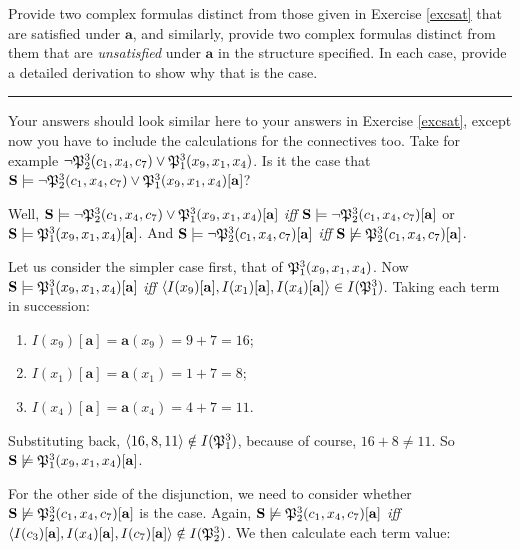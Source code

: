 \begin{exc}
Provide two complex formulas distinct from those given in Exercise \ref{excsat} that are satisfied under $\mathbf{a}$, and similarly, provide two complex formulas distinct from them that are \textit{unsatisfied} under $\mathbf{a}$ in the structure specified. In each case, provide a detailed derivation to show why that is the case. 
\end{exc}

\hrule\medskip

\begin{remark}
Your answers should look similar here to your answers in Exercise \ref{excsat}, except now you have to include the calculations for the connectives too. Take for example $\neg\mathfrak{P}^{3}_{2}(c_1, x_4, c_7) \vee \mathfrak{P}^{3}_{1}(x_9, x_1, x_4)$. Is it the case that $\mathbf{S} \models \neg\mathfrak{P}^{3}_{2}(c_1, x_4, c_7) \vee \mathfrak{P}^{3}_{1}(x_9, x_1, x_4)[\mathbf{a}]$?

Well, $\mathbf{S} \models \neg\mathfrak{P}^{3}_{2}(c_1, x_4, c_7) \vee \mathfrak{P}^{3}_{1}(x_9, x_1, x_4)[\mathbf{a}]$ \textit{iff} $\mathbf{S} \models \neg\mathfrak{P}^{3}_{2}(c_1, x_4, c_7)[\mathbf{a}]$ or $\mathbf{S} \models \mathfrak{P}^{3}_{1}(x_9, x_1, x_4)[\mathbf{a}]$. And $\mathbf{S} \models \neg\mathfrak{P}^{3}_{2}(c_1, x_4, c_7)[\mathbf{a}]$ \textit{iff} $\mathbf{S} \not\models \mathfrak{P}^{3}_{2}(c_1, x_4, c_7)[\mathbf{a}]$. 

Let us consider the simpler case first, that of $\mathfrak{P}^{3}_{1}(x_9, x_1, x_4)$. Now  $\mathbf{S} \models \mathfrak{P}^{3}_{1}(x_9, x_1, x_4)[\mathbf{a}]$ \textit{iff} $\langle I(x_9)[\mathbf{a}], I(x_1)[\mathbf{a}], I(x_4)[\mathbf{a}]\rangle \in I(\mathfrak{P}^{3}_{1})$. Taking each term in succession: 

\begin{enumerate}
	\item $I(x_9)[\mathbf{a}]=\mathbf{a}(x_9)=9+7=16$;
	\item $I(x_1)[\mathbf{a}]=\mathbf{a}(x_1)=1+7=8$;
	\item $I(x_4)[\mathbf{a}]=\mathbf{a}(x_4)=4+7=11$.
\end{enumerate}
%
Substituting back, $\langle16, 8, 11\rangle \notin I(\mathfrak{P}^{3}_{1})$, because of course, $16+8 \neq 11$. So $\mathbf{S} \not\models \mathfrak{P}^{3}_{1}(x_9, x_1, x_4)[\mathbf{a}]$.

For the other side of the disjunction, we need to consider whether $\mathbf{S} \not\models \mathfrak{P}^{3}_{2}(c_1, x_4, c_7)[\mathbf{a}]$ is the case. Again, $\mathbf{S} \not\models \mathfrak{P}^{3}_{2}(c_1, x_4, c_7)[\mathbf{a}]$ \textit{iff} $\langle I(c_3)[\mathbf{a}], I(x_4)[\mathbf{a}], I(c_7)[\mathbf{a}]\rangle \notin I(\mathfrak{P}^{3}_{2})$. We then calculate each term value:


\end{remark}
